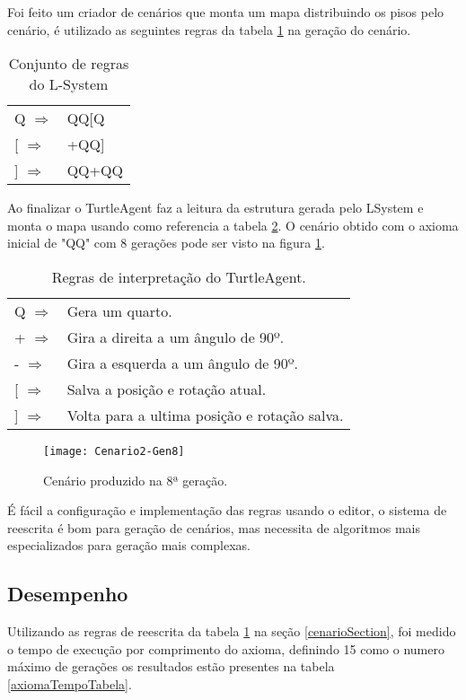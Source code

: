 \label{cenarioSection}
Foi feito um criador de cenários que monta um mapa distribuindo os pisos pelo cenário, é utilizado as seguintes regras da tabela \ref{cenárioRules} na geração do cenário.

\begin{table}[]
	\centering
	\begin{tabular}{ll}
		Q $\Rightarrow$   & QQ{[}Q \\ 
		{[} $\Rightarrow$ & +QQ{]} \\ 
		{]} $\Rightarrow$ & QQ+QQ  \\ 
	\end{tabular}
	\caption{Conjunto de regras do L-System}
	\label{cenárioRules}
\end{table}

Ao finalizar o TurtleAgent faz a leitura da estrutura gerada pelo LSystem e monta o mapa usando como referencia a tabela \ref{cenárioTurtle}. O cenário obtido com o axioma inicial de "QQ" com 8 gerações pode ser visto na figura \ref{cenário8Gen}.
\begin{table}[]
	\centering
	\begin{tabular}{ll}
		Q $\Rightarrow$   & Gera um quarto.                              \\
		+  $\Rightarrow$  & Gira a direita a um ângulo de 90º.            \\
		-  $\Rightarrow$  & Gira a esquerda a um ângulo de 90º.           \\
		{[}  $\Rightarrow$ & Salva a posição e rotação atual.             \\
		{]}  $\Rightarrow$ & Volta para a ultima posição e rotação salva.
	\end{tabular}
	\caption{Regras de interpretação do TurtleAgent.}
	\label{cenárioTurtle}
\end{table}

\begin{figure}[!h]
	\centering
	\texttt{[image: Cenario2-Gen8]}
	\caption{Cenário produzido na 8ª geração.}
	\label{cenário8Gen}
\end{figure}

É fácil a configuração e implementação das regras usando o editor, o sistema de reescrita é bom para geração de cenários, mas necessita de algoritmos mais especializados para geração mais complexas.

\subsection{Desempenho}
Utilizando as regras de reescrita da tabela \ref{cenárioRules} na seção \ref{cenarioSection}, foi medido o tempo de execução por comprimento do axioma, definindo 15 como o numero máximo de gerações os resultados estão presentes na tabela  \ref{axiomaTempoTabela}.

